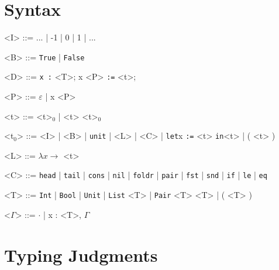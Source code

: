 \documentclass[10pt]{article}
\newcommand{\ttt}[1]{\texttt{#1}}
\newcommand{\ra}{\ensuremath{\rightarrow}}
\newcommand{\head}{\ttt{head}}
\newcommand{\tail}{\ttt{tail}}
\newcommand{\cons}{\ttt{cons}}
\newcommand{\nil}{\ttt{nil}}
\newcommand{\foldr}{\ttt{foldr}}
\newcommand{\pair}{\ttt{pair}}
\newcommand{\fst}{\ttt{fst}}
\newcommand{\snd}{\ttt{snd}}
\newcommand{\ite}{\ttt{if}}
\newcommand{\letbnd}{\ttt{let}}
\newcommand{\inexpr}{\ttt{in}}
\newcommand{\lesseq}{\ttt{le}}
\newcommand{\eq}{\ttt{eq}}
\begin{document}
\section{Syntax}

\begin{grammar}
  <I> ::= ... | -1 | 0 | 1 | ...

  <B> ::= \ttt{True} | \ttt{False}

  <D> ::= \ttt{x :} <T>; x <P> \ttt{:=} <t>;

  <P> ::= $\varepsilon$ | x <P>

  <t> ::= <t>$_0$ | <t> <t>$_0$

  <t$_0$> ::= <I> | <B> | \ttt{unit} | <L> | <C> | \letbnd x \ttt{:=} <t> \inexpr <t> | ( <t> )

  <L> ::= $\lambda x \ra$ <t>

  <C> ::= \head\; | \tail\; | \cons\; | \nil\; | \foldr\; | \pair\; | \fst\; | \snd\; | \ite\; | \lesseq\; | \eq

  <T> ::= \ttt{Int} | \ttt{Bool} | \ttt{Unit} | \ttt{List} <T> | \ttt{Pair} <T> <T> | ( <T> )

  <$\Gamma$> ::= $\cdot$ | x : <T>, $\Gamma$
\end{grammar}

\section{Typing Judgments}
\end{document}
